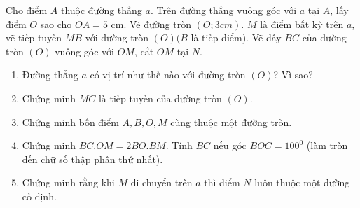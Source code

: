 \begin{ex}%
Cho điểm $A$ thuộc đường thẳng $a$. Trên đường thẳng vuông góc với $a$ tại $A$, lấy điểm $O$ sao cho $OA=5$ cm. Vẽ đường tròn $(O;3 cm)$. $M$ là điểm bất kỳ trên $a$, vẽ tiếp tuyến $MB$ với đường tròn $(O)(B$ là tiếp điểm). Vẽ dây $BC$ của đường tròn $(O)$ vuông góc với $OM$, cắt $OM$ tại $N$.
\begin{enumerate}
\item Đường thẳng $a$ có vị trí như thế nào với đường tròn $(O)$? Vì sao?
\item Chứng minh $MC$ là tiếp tuyến của đường tròn $(O)$.
\item Chứng minh bốn điểm $A,B,O,M$ cùng thuộc một đường tròn.
\item Chứng minh $BC.OM=2BO.BM$. Tính $BC$ nếu góc $BOC=100^0$ (làm tròn đến chữ số thập phân thứ nhất).
\item Chứng minh rằng khi $M$ di chuyển trên $a$ thì điểm $N$ luôn thuộc một đường cố định.
\end{enumerate}
\end{ex}
